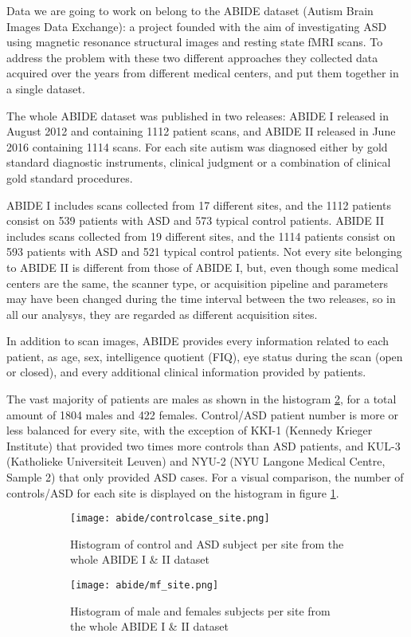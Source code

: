 \documentclass[11pt]{report}
\begin{document}
Data we are going to work on belong to the ABIDE dataset (Autism Brain Images Data Exchange): a project founded with the aim of investigating ASD using magnetic resonance structural images and resting state fMRI scans.
To address the problem with these two different approaches they collected data acquired over the years from different medical centers, and put them together in a single dataset.

The whole ABIDE dataset was published in two releases: ABIDE I released in August 2012 and containing 1112 patient scans, and ABIDE II released in June 2016 containing 1114 scans.
For each site autism was diagnosed either by gold standard diagnostic instruments, clinical judgment or a combination of clinical gold standard procedures.

ABIDE I includes scans collected from 17 different sites, and the 1112 patients consist on 539 patients with ASD and 573 typical control patients.
ABIDE II includes scans collected from 19 different sites, and the 1114 patients consist on 593 patients with ASD and 521 typical control patients.
Not every site belonging to ABIDE II is different from those of ABIDE I, but, even though some medical centers are the same, the scanner type, or acquisition pipeline and parameters may have been changed during the time interval between the two releases, so in all our analysys, they are regarded as different acquisition sites.

In addition to scan images, ABIDE provides every information related to each patient, as age, sex, intelligence quotient (FIQ), eye status during the scan (open or closed), and every additional clinical information provided by patients.

The vast majority of patients are males as shown in the histogram \ref{fig:mf_site}, for a total amount of 1804 males and 422 females.
Control/ASD patient number is more or less balanced for every site, with the exception of KKI-1 (Kennedy Krieger Institute) that provided two times more controls than ASD patients, and KUL-3 (Katholieke Universiteit Leuven) and NYU-2 (NYU Langone Medical Centre, Sample 2) that only provided ASD cases. For a visual comparison, the number of controls/ASD for each site is displayed on the histogram in figure \ref{fig:controlcase_site}.

\begin{figure}[h]
\centering
\begin{subfigure}{0.9\textwidth}
\texttt{[image: abide/controlcase\_site.png]}
\caption{Histogram of control and ASD subject per site from the whole ABIDE I \& II dataset}
\label{fig:controlcase_site}
\end{subfigure}
\begin{subfigure}{0.9\textwidth}
\texttt{[image: abide/mf\_site.png]}
\caption{Histogram of male and females subjects per site from the whole ABIDE I \& II dataset}
\label{fig:mf_site}
\end{subfigure}
\caption{}
\label{}
\end{figure}
\end{document}
